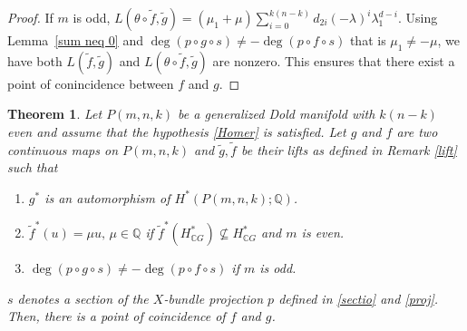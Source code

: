 \documentclass{amsart}
\newtheorem{theorem}{Theorem}[section]
\newcommand{\lemref}[1]{Lemma~\ref{#1}}
\newcommand{\remref}[1]{Remark~\ref{#1}}
\begin{document}
\begin{proof}
	If $m$ is odd, $	L(\theta \circ\tilde f,\tilde g) =(\mu_1 + \mu)\sum_{i=0}^{k(n-k)} d_{2i} (-\lambda)^i\lambda_1^{d-i}.$ Using  \lemref{sum neq 0} and $\deg(p\circ g \circ s)\neq -\deg (p\circ f\circ s)$ that is $\mu_1 \neq -\mu$, we have both $L(\tilde{f},\tilde{g})$ and $L(\theta \circ\tilde f,\tilde g)$ are nonzero. 
	This ensures that there exist a point of conincidence between $f $ and $g$.
\end{proof}
\begin{theorem}\label{coincidence thm under hom}
	Let $P(m,n,k)$ be a generalized Dold manifold with $k(n-k)$ even and assume that the hypothesis \eqref{Homer} is satisfied. Let $g$ and $f$ are two continuous maps on $P(m,n,k)$ and $\tilde g, \tilde f$ be their lifts as defined in  Remark \ref{lift} such that
	\begin{enumerate}	
		\item $g^*$ is an automorphism of $H^*(P(m,n,k);\mathbb Q)$. 
		\item $\tilde{f}^*(u) = \mu u,\, \mu \in \mathbb{Q}$ if $\tilde{f}^*(H^*_{\mathbb CG}) \nsubseteq H^*_{\mathbb CG}$ and $m$ is even.
		\item $\deg(p\circ g \circ s)\neq -\deg (p\circ f\circ s)$ if $m$ is odd.
	\end{enumerate}
	$s$ denotes a section of the $X$-bundle projection $p$ defined in \eqref{sectio} and \eqref{proj}. Then, there is a point of coincidence of $f$ and  $g$.
\end{theorem}
\end{document}
